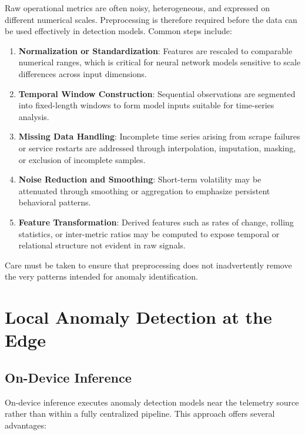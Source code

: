 Raw operational metrics are often noisy, heterogeneous, and expressed on different
numerical scales. Preprocessing is therefore required before the data can be used
effectively in detection models. Common steps include:

\begin{enumerate}
    \item \textbf{Normalization or Standardization}: Features are rescaled to
    comparable numerical ranges, which is critical for neural network models sensitive
    to scale differences across input dimensions.

    \item \textbf{Temporal Window Construction}: Sequential observations are segmented
    into fixed-length windows to form model inputs suitable for time-series analysis.

    \item \textbf{Missing Data Handling}: Incomplete time series arising from scrape
    failures or service restarts are addressed through interpolation, imputation,
    masking, or exclusion of incomplete samples.

    \item \textbf{Noise Reduction and Smoothing}: Short-term volatility may be
    attenuated through smoothing or aggregation to emphasize persistent behavioral
    patterns.

    \item \textbf{Feature Transformation}: Derived features such as rates of change,
    rolling statistics, or inter-metric ratios may be computed to expose temporal or
    relational structure not evident in raw signals.
\end{enumerate}

Care must be taken to ensure that preprocessing does not inadvertently remove the very
patterns intended for anomaly identification.

\section{Local Anomaly Detection at the Edge}
\label{sec:edge_detection}

\subsection{On-Device Inference}
\label{subsec:edge_detection_concept}

On-device inference executes anomaly detection models near the telemetry source rather
than within a fully centralized pipeline. This approach offers several advantages:

